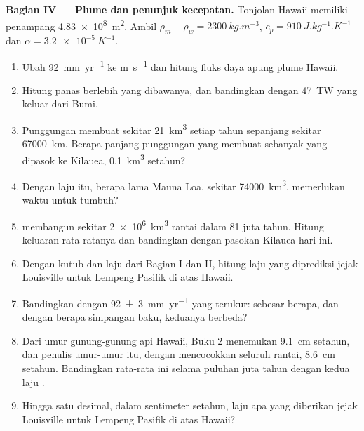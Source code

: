 \begin{problem}
\medskip
\noindent\textbf{Bagian IV --- Plume dan penunjuk kecepatan.} Tonjolan Hawaii memiliki penampang \qty{4.83e8}{m^2}. Ambil $\rho_m - \rho_w = \qty{2300}{kg.m^{-3}}$, $c_p = \qty{910}{J.kg^{-1}.K^{-1}}$ dan $\alpha = \qty{3.2e-5}{K^{-1}}$.
\begin{enumerate}[resume]
  \item Ubah \qty{92}{mm.yr^{-1}} ke \unit{m.s^{-1}} dan hitung fluks daya apung plume Hawaii.
  \item Hitung panas berlebih yang dibawanya, dan bandingkan dengan \qty{47}{TW} yang keluar dari Bumi.
  \item Punggungan membuat sekitar \qty{21}{km^3}  setiap tahun sepanjang sekitar \qty{67000}{km}. Berapa panjang punggungan yang membuat  sebanyak yang dipasok ke Kilauea, \qty{0.1}{km^3} setahun?
  \item Dengan laju itu, berapa lama Mauna Loa, sekitar \qty{74000}{km^3}, memerlukan waktu untuk tumbuh?
  \item {} membangun sekitar \qty{2e6}{km^3} rantai dalam 81 juta tahun. Hitung keluaran rata-ratanya dan bandingkan dengan pasokan Kilauea hari ini.
  \item Dengan kutub dan laju dari Bagian I dan II, hitung laju yang diprediksi jejak Louisville untuk Lempeng Pasifik di atas  Hawaii.
  \item Bandingkan dengan \qty[uncertainty-mode=separate]{92 \pm 3}{mm.yr^{-1}} yang terukur: sebesar berapa, dan dengan berapa simpangan baku, keduanya berbeda?
  \item Dari umur gunung-gunung api Hawaii, Buku 2 menemukan \qty{9.1}{cm} setahun, dan penulis umur-umur itu, dengan mencocokkan seluruh rantai, \qty{8.6}{cm} setahun. Bandingkan rata-rata ini selama puluhan juta tahun dengan kedua laju .
  \item Hingga satu desimal, dalam sentimeter setahun, laju apa yang diberikan jejak Louisville untuk Lempeng Pasifik di atas  Hawaii?
\end{enumerate}
\end{problem}
